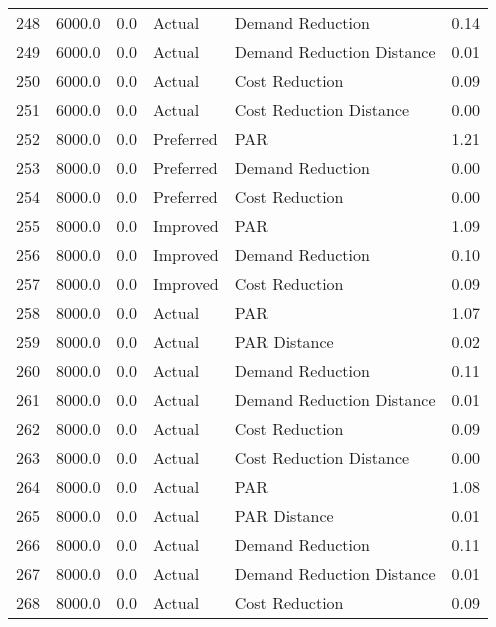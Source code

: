 \begin{longtable}{lrrllr}
248  &       6000.0 &     0.0 &         Actual &           Demand Reduction &   0.14 \\
249  &       6000.0 &     0.0 &         Actual &  Demand Reduction Distance &   0.01 \\
250  &       6000.0 &     0.0 &         Actual &             Cost Reduction &   0.09 \\
251  &       6000.0 &     0.0 &         Actual &    Cost Reduction Distance &   0.00 \\
252  &       8000.0 &     0.0 &      Preferred &                        PAR &   1.21 \\
253  &       8000.0 &     0.0 &      Preferred &           Demand Reduction &   0.00 \\
254  &       8000.0 &     0.0 &      Preferred &             Cost Reduction &   0.00 \\
255  &       8000.0 &     0.0 &       Improved &                        PAR &   1.09 \\
256  &       8000.0 &     0.0 &       Improved &           Demand Reduction &   0.10 \\
257  &       8000.0 &     0.0 &       Improved &             Cost Reduction &   0.09 \\
258  &       8000.0 &     0.0 &         Actual &                        PAR &   1.07 \\
259  &       8000.0 &     0.0 &         Actual &               PAR Distance &   0.02 \\
260  &       8000.0 &     0.0 &         Actual &           Demand Reduction &   0.11 \\
261  &       8000.0 &     0.0 &         Actual &  Demand Reduction Distance &   0.01 \\
262  &       8000.0 &     0.0 &         Actual &             Cost Reduction &   0.09 \\
263  &       8000.0 &     0.0 &         Actual &    Cost Reduction Distance &   0.00 \\
264  &       8000.0 &     0.0 &         Actual &                        PAR &   1.08 \\
265  &       8000.0 &     0.0 &         Actual &               PAR Distance &   0.01 \\
266  &       8000.0 &     0.0 &         Actual &           Demand Reduction &   0.11 \\
267  &       8000.0 &     0.0 &         Actual &  Demand Reduction Distance &   0.01 \\
268  &       8000.0 &     0.0 &         Actual &             Cost Reduction &   0.09 \\

\end{longtable}
